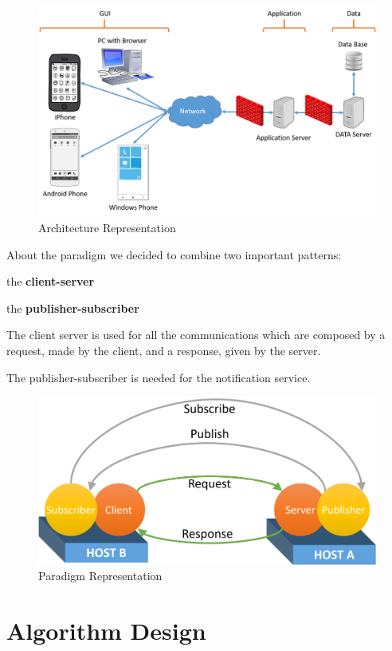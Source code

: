 \documentclass[a4paper]{article}
\begin{document}
\nopagebreak

\begin{figure}[H]
\includegraphics[width=.9\textwidth]{Architecture}
\centering
\caption{Architecture Representation}
\label{fig:architecture}
\end{figure}

About the paradigm we decided to combine two important patterns: 
\begin{itemize*}
\item the \textbf{client-server}
\item the \textbf{publisher-subscriber}
\end{itemize*}

The client server is used for all the communications which are composed by a request, made by the client, and a response, given by the server.

The publisher-subscriber is needed for the notification service.

\begin{figure}[H]
\includegraphics[width=.65\textwidth]{Paradigm}
\centering
\caption{Paradigm Representation}
\label{fig:paradigm}
\end{figure}

\section{Algorithm Design}
\label{sec:sec3}
\end{document}
